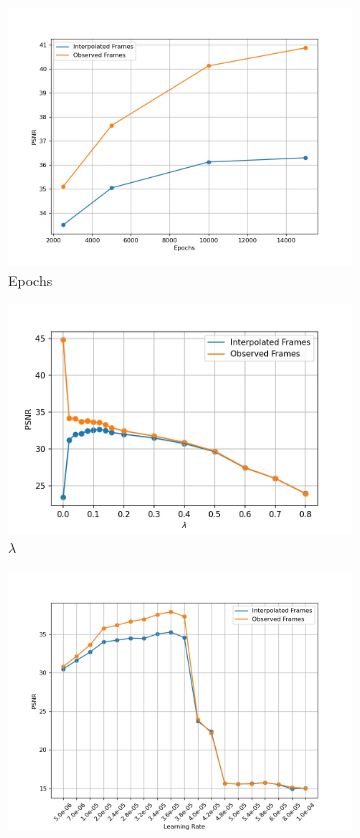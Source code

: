 \documentclass{article}
\begin{document}
\begin{figure}
\centering
\begin{subfigure}{1\textwidth}
	\centering
    \includegraphics[width=0.6\linewidth]{Epochs.jpg}
    \caption{Epochs}
\end{subfigure}
\begin{subfigure}{0.6\textwidth}
	\centering
    \includegraphics[width=1\linewidth]{lambda.jpg}
	\caption{$\lambda$}
\end{subfigure}%
\begin{subfigure}{0.6\textwidth}
\centering
    \includegraphics[width=1\linewidth]{LR.jpg}

\end{subfigure}
\end{figure}
\end{document}
